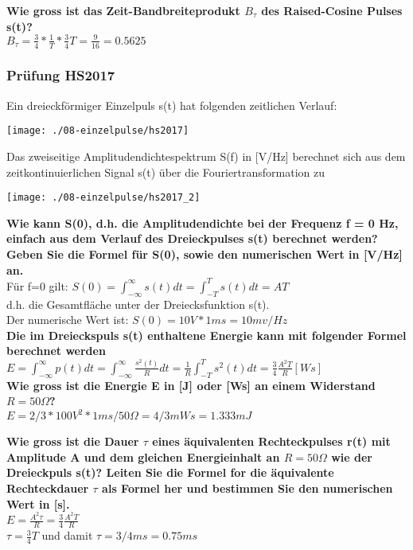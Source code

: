 \textbf{Wie gross ist das Zeit-Bandbreiteprodukt $B_{\tau}$ des Raised-Cosine Pulses s(t)?}\\
$B_{\tau}=\frac{3}{4}*\frac{1}{T}*\frac{3}{4}T=\frac{9}{16}=0.5625$

\subsubsection{Prüfung HS2017}
Ein dreieckförmiger Einzelpuls s(t) hat folgenden zeitlichen Verlauf:
\begin{center}
    \vspace{-8pt}
    \texttt{[image: ./08-einzelpulse/hs2017]}
    \vspace{-8pt}
\end{center}

Das zweiseitige Amplitudendichtespektrum S(f) in [V/Hz] berechnet sich aus dem zeitkontinuierlichen Signal s(t) über die Fouriertransformation zu\\
\begin{center}
    \vspace{-8pt}
    \texttt{[image: ./08-einzelpulse/hs2017\_2]}
    \vspace{-8pt}
\end{center}

\textbf{Wie kann S(0), d.h. die Amplitudendichte bei der Frequenz f = 0 Hz, \textbf{einfach} aus dem Verlauf des Dreieckpulses s(t) berechnet werden? Geben Sie die Formel für S(0), sowie
den numerischen Wert in [V/Hz] an.}\\
Für f=0 gilt: $S(0)=\int_{-\infty}^{\infty}s(t)dt=\int_{-T}^{T}s(t)dt=AT$\\

d.h. die Gesamtfläche unter der Dreiecksfunktion s(t).\\
Der numerische Wert ist: $S(0)=10V*1ms=10mv/Hz$\\

\textbf{Die im Dreieckspuls s(t) enthaltene Energie kann mit folgender Formel berechnet werden}\\
$E=\int_{-\infty}^{\infty}p(t)dt=\int_{-\infty}^{\infty}\frac{s^2(t)}{R}dt=\frac{1}{R}\int_{-T}^{T}s^2(t)dt=\frac{3}{4}\frac{A^2T}{R}[Ws]$\\

\textbf{Wie gross ist die Energie E in [J] oder [Ws] an einem Widerstand $R = 50 \Omega$?}\\
$E = 2/3 * 100 V^2 * 1ms / 50 \Omega = 4/3 mWs = 1.333 mJ$

\textbf{Wie gross ist die Dauer $\tau$ eines äquivalenten Rechteckpulses r(t) mit Amplitude A und dem gleichen Energieinhalt an $R = 50 \Omega$ wie der Dreieckpuls s(t)? Leiten Sie die Formel for die äquivalente Rechteckdauer $\tau$ als Formel her und bestimmen Sie den numerischen
Wert in [s].}\\
$E=\frac{A^2 \tau }{R}=\frac{3}{4}\frac{A^2T}{R}$\\
$\tau=\frac{3}{4}T$ und damit $\tau=3/4 ms = 0.75ms$\\

